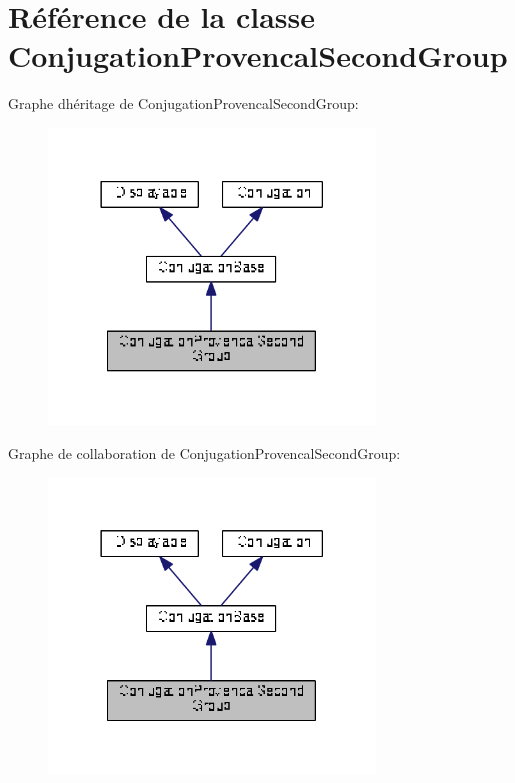 \hypertarget{class_conjugation_provencal_second_group}{}\section{Référence de la classe Conjugation\+Provencal\+Second\+Group}
\label{class_conjugation_provencal_second_group}


Graphe d\textquotesingle{}héritage de Conjugation\+Provencal\+Second\+Group\+:
\nopagebreak
\begin{figure}[H]
\begin{center}
\leavevmode
\includegraphics[width=246pt]{class_conjugation_provencal_second_group__inherit__graph}
\end{center}
\end{figure}


Graphe de collaboration de Conjugation\+Provencal\+Second\+Group\+:
\nopagebreak
\begin{figure}[H]
\begin{center}
\leavevmode
\includegraphics[width=246pt]{class_conjugation_provencal_second_group__coll__graph}
\end{center}
\end{figure}
